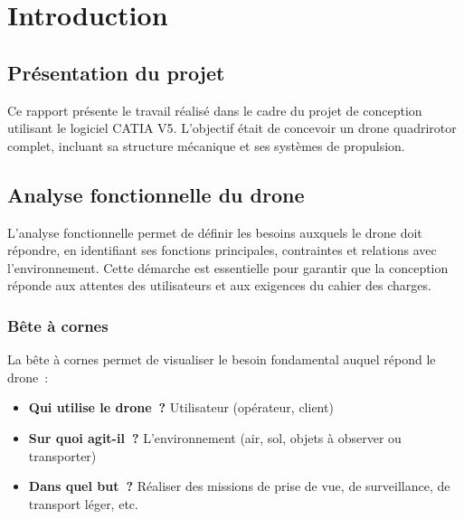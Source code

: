 \documentclass[a4paper,12pt]{report}
\begin{document}
\tableofcontents
\newpage

\chapter{Introduction}
\section{Présentation du projet}
Ce rapport présente le travail réalisé dans le cadre du projet de conception utilisant le logiciel CATIA V5. L'objectif était de concevoir un drone quadrirotor complet, incluant sa structure mécanique et ses systèmes de propulsion.

\section{Analyse fonctionnelle du drone}
L'analyse fonctionnelle permet de définir les besoins auxquels le drone doit répondre, en identifiant ses fonctions principales, contraintes et relations avec l'environnement. Cette démarche est essentielle pour garantir que la conception réponde aux attentes des utilisateurs et aux exigences du cahier des charges.

\subsection{Bête à cornes}
La bête à cornes permet de visualiser le besoin fondamental auquel répond le drone :

\begin{itemize}
    \item \textbf{Qui utilise le drone ?} \quad Utilisateur (opérateur, client)
    \item \textbf{Sur quoi agit-il ?} \quad L'environnement (air, sol, objets à observer ou transporter)
    \item \textbf{Dans quel but ?} \quad Réaliser des missions de prise de vue, de surveillance, de transport léger, etc.
\end{itemize}
\end{document}
